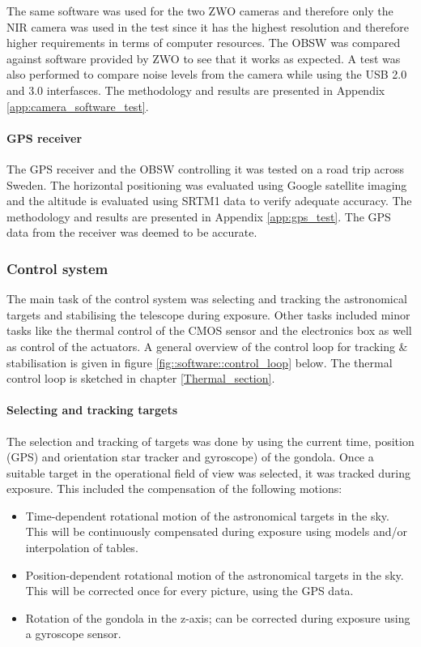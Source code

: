 The same software was used for the two ZWO cameras and therefore only the NIR camera was used in the test since it has the highest resolution and therefore higher requirements in terms of computer resources. The OBSW was compared against software provided by ZWO to see that it works as expected. A test was also performed to compare noise levels from the camera while using the USB 2.0 and 3.0 interfasces. The methodology and results are presented in Appendix \ref{app:camera_software_test}.

\paragraph{GPS receiver}

The GPS receiver and the OBSW controlling it was tested on a road trip across Sweden. The horizontal positioning was evaluated using Google satellite imaging and the altitude is evaluated using SRTM1 data to verify adequate accuracy. The methodology and results are presented in Appendix \ref{app:gps_test}. The GPS data from the receiver was deemed to be accurate.


\subsubsection{Control system}
The main task of the control system was selecting and tracking the astronomical targets and stabilising the telescope during exposure. Other tasks included minor tasks like the thermal control of the CMOS sensor and the electronics box as well as control of the actuators. A general overview of the control loop for tracking \& stabilisation is given in figure  \mbox{\ref{fig::software::control_loop}} below. The thermal control loop is sketched in chapter \mbox{\ref{Thermal_section}}.

\paragraph{Selecting and tracking targets}

The selection and tracking of targets was done by using the current time, position (GPS) and orientation star tracker and gyroscope) of the gondola. Once a suitable target in the operational field of view was selected, it was tracked during exposure. This included the compensation of the following motions:
\begin{itemize}
    \item Time-dependent rotational motion of the astronomical targets in the sky. This will be continuously compensated during exposure using models and/or interpolation of tables.
    \item Position-dependent rotational motion of the astronomical targets in the sky. This will be corrected once for every picture, using the GPS data.
    \item Rotation of the gondola in the z-axis; can be corrected during exposure using a gyroscope sensor.
\end{itemize}

